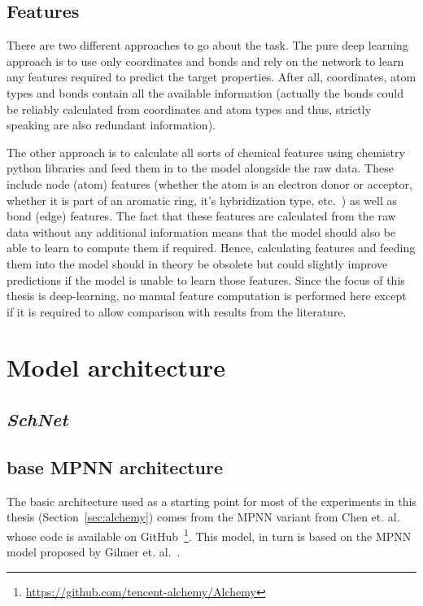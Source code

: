 \subsection{Features}
\label{sec:features}

There are two different approaches to go about the task. The pure deep learning approach is to use only coordinates and bonds and rely on the network to learn any features required to predict the target properties. After all, coordinates, atom types and bonds contain all the available information (actually the bonds could be reliably calculated from coordinates and atom types and thus, strictly speaking are also redundant information).

The other approach is to calculate all sorts of chemical features using chemistry python libraries and feed them in to the model alongside the raw data. These include node (atom) features (whether the atom is an electron donor or acceptor, whether it is part of an aromatic ring, it's hybridization type, etc.~\cite{Organic-chemistry}) as well as bond (edge) features. The fact that these features are calculated from the raw data without any additional information means that the model should also be able to learn to compute them if required. Hence, calculating features and feeding them into the model should in theory be obsolete but could slightly improve predictions if the model is unable to learn those features. Since the focus of this thesis is deep-learning, no manual feature computation is performed here except if it is required to allow comparison with results from the literature.


\section{Model architecture}
\label{sec:architecture}


\subsection{\textit{SchNet}}
\label{sec:schnet-architecture}

\subsection{base MPNN architecture}
\label{sec:mpnn-architecture}

The basic architecture used as a starting point for most of the experiments in this thesis (Section~\ref{sec:alchemy}) comes from the MPNN variant from Chen et. al.~\cite{Chen2019} whose code is available on GitHub~\footnote{\url{https://github.com/tencent-alchemy/Alchemy}}. This model, in turn is based on the MPNN model proposed by Gilmer et. al.~\cite{Gilmer2017}.

